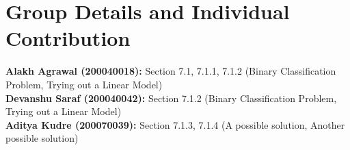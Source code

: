 \documentclass[11pt, twosides]{article}
\begin{document}
\section{Group Details and Individual Contribution}
\textbf{Alakh Agrawal (200040018):} Section 7.1, 7.1.1, 7.1.2 (Binary Classification Problem, Trying out a Linear Model)\\
\textbf{Devanshu Saraf (200040042):} Section 7.1.2 (Binary Classification Problem, Trying out a Linear Model)\\
\textbf{Aditya Kudre (200070039):} Section 7.1.3, 7.1.4 (A possible solution, Another possible solution)
\end{document}

